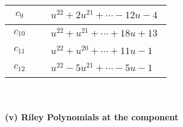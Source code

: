 \documentclass[1p]{elsarticle_modified}
\theoremstyle{definition}
\begin{document}
\begin{tabular}{m{50pt}|m{274pt}}
\hline $$\begin{aligned}c_{9}\end{aligned}$$&$\begin{aligned}
&u^{22}+2 u^{21}+\cdots-12 u-4
\end{aligned}$\\
\hline $$\begin{aligned}c_{10}\end{aligned}$$&$\begin{aligned}
&u^{22}+u^{21}+\cdots+18 u+13
\end{aligned}$\\
\hline $$\begin{aligned}c_{11}\end{aligned}$$&$\begin{aligned}
&u^{22}+u^{20}+\cdots+11 u-1
\end{aligned}$\\
\hline $$\begin{aligned}c_{12}\end{aligned}$$&$\begin{aligned}
&u^{22}-5 u^{21}+\cdots-5 u-1
\end{aligned}$\\
\hline
\end{tabular}\\~\\
\newpage\renewcommand{\arraystretch}{1}
\flushleft \textbf{(v) Riley Polynomials at the component}\newline \\
\end{document}
